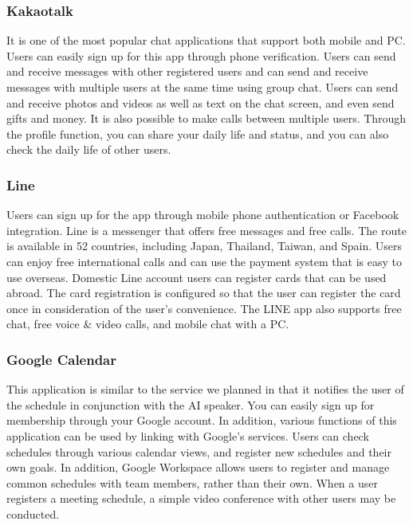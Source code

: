 \documentclass[conference]{IEEEtran}
\begin{document}
\subsubsection{Kakaotalk}

It is one of the most popular chat applications that support both mobile and PC. Users can easily sign up for this app through phone verification. Users can send and receive messages with other registered users and can send and receive messages with multiple users at the same time using group chat. Users can send and receive photos and videos as well as text on the chat screen, and even send gifts and money. It is also possible to make calls between multiple users. Through the profile function, you can share your daily life and status, and you can also check the daily life of other users.

\subsubsection{Line}

Users can sign up for the app through mobile phone authentication or Facebook integration. Line is a messenger that offers free messages and free calls. The route is available in 52 countries, including Japan, Thailand, Taiwan, and Spain. Users can enjoy free international calls and can use the payment system that is easy to use overseas. Domestic Line account users can register cards that can be used abroad. The card registration is configured so that the user can register the card once in consideration of the user's convenience. The LINE app also supports free chat, free voice \& video calls, and mobile chat with a PC.

\subsubsection{Google Calendar}

This application is similar to the service we planned in that it notifies the user of the schedule in conjunction with the AI speaker. You can easily sign up for membership through your Google account. In addition, various functions of this application can be used by linking with Google's services. Users can check schedules through various calendar views, and register new schedules and their own goals. In addition, Google Workspace allows users to register and manage common schedules with team members, rather than their own. When a user registers a meeting schedule, a simple video conference with other users may be conducted.
\end{document}
